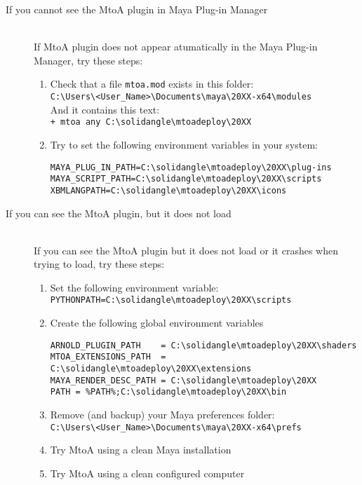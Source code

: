 \begin{description}

\item[If you cannot see the MtoA plugin in Maya Plug-in Manager] \hfill \\

If MtoA plugin does not appear atumatically in the Maya Plug-in Manager, try these steps:

\begin{enumerate}
\item Check that a file \texttt{mtoa.mod} exists in this folder:\\
\verb|C:\Users\<User_Name>\Documents\maya\20XX-x64\modules|\\
And it contains this text:\\
\verb|+ mtoa any C:\solidangle\mtoadeploy\20XX|\\

\item Try to set the following environment variables in your system:
{\footnotesize \begin{verbatim}
MAYA_PLUG_IN_PATH=C:\solidangle\mtoadeploy\20XX\plug-ins
MAYA_SCRIPT_PATH=C:\solidangle\mtoadeploy\20XX\scripts
XBMLANGPATH=C:\solidangle\mtoadeploy\20XX\icons
\end{verbatim}}
\end{enumerate}

\item[If you can see the MtoA plugin, but it does not load] \hfill \\
If you can see the MtoA plugin but it does not load or it crashes when trying to load, try these steps:
\begin{enumerate}
\item Set the following environment variable:\\
\verb|PYTHONPATH=C:\solidangle\mtoadeploy\20XX\scripts|

\item Create the following global environment variables
{\footnotesize \begin{verbatim}
ARNOLD_PLUGIN_PATH    = C:\solidangle\mtoadeploy\20XX\shaders
MTOA_EXTENSIONS_PATH  = C:\solidangle\mtoadeploy\20XX\extensions
MAYA_RENDER_DESC_PATH = C:\solidangle\mtoadeploy\20XX
PATH = %PATH%;C:\solidangle\mtoadeploy\20XX\bin
\end{verbatim}}

\item Remove (and backup) your Maya preferences folder:\\
\verb|C:\Users\<User_Name>\Documents\maya\20XX-x64\prefs|

\item Try MtoA using a clean Maya installation

\item Try MtoA using a clean configured computer

\end{enumerate}

\end{description}


